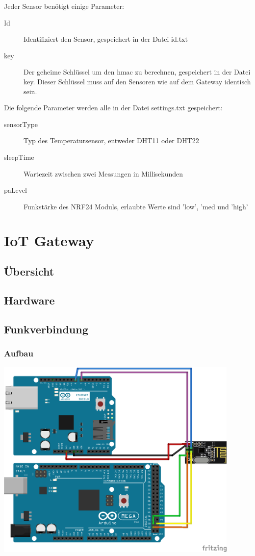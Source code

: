 \documentclass[
  12pt, %
  a4paper, %
  twoside, %
  openany, %
  numbers=noenddot, %
  BCOR=5mm, %
  parskip=half*, %
  thesis, %
]{bfhbook}
\begin{document}
 Jeder Sensor benötigt einige Parameter:
 \begin{description}
\item[Id] Identifiziert den Sensor, gespeichert in der Datei id.txt
\item[key] Der geheime Schlüssel um den \Gls{hmac} zu berechnen, gespeichert in der Datei key. Dieser Schlüssel muss auf den Sensoren wie auf dem Gateway identisch sein.
\end{description}
Die folgende Parameter werden alle in der Datei settings.txt gespeichert:
 \begin{description}
\item[sensorType] Typ des Temperatursensor, entweder DHT11 oder DHT22
\item[sleepTime] Wartezeit zwischen zwei Messungen in Millisekunden
\item[paLevel] Funkstärke des NRF24 Moduls, erlaubte Werte sind 'low', 'med und 'high'
\end{description}
%
\chapter{IoT Gateway}
\section{Übersicht}
\section{Hardware}
\section{Funkverbindung}
\subsection{Aufbau}
\begin{center}
  \begin{center}
    \includegraphics[width=12cm, left]{Bilder/MQTT-Gateway-Design_Steckplatine.png}
  \end{center}
\end{center}
\end{document}

